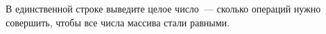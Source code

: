 В единственной строке выведите целое число~--- сколько операций нужно совершить, чтобы все числа массива стали равными.
